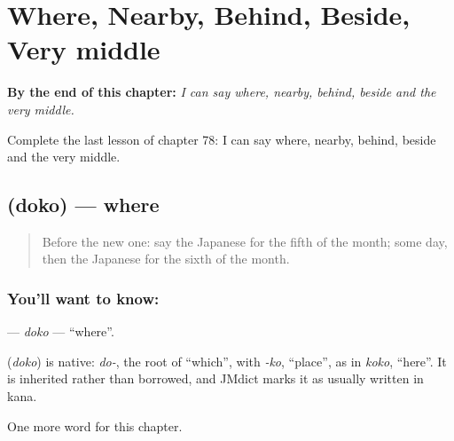 
\chapter{Where, Nearby, Behind, Beside, Very middle}
\label{ch:ja-where-nearby-behind-beside-very-middle}

\begin{chapteropening}
\textbf{By the end of this chapter:} \emph{I can say where, nearby, behind, beside and the very middle.}

Complete the last lesson of chapter 78: I can say where, nearby, behind, beside and the very middle.
\end{chapteropening}

\section[\texorpdfstring{\ja{どこ} (doko)}{どこ (doko)}]{ (doko) — where}

\label{lesson:JA-C78-doko}



\begin{quote}
Before the new one: say the Japanese for the fifth of the month; some day, then the Japanese for the sixth of the month.
\end{quote}

\subsection*{You'll want to know: }
\textbf{} — \emph{doko} — \textquotedblleft{}where\textquotedblright{}.

\begin{cousinweb}
\textbf{} (\emph{doko}) is native: \emph{do-}, the root of \textquotedblleft{}which\textquotedblright{}, with \emph{-ko}, \textquotedblleft{}place\textquotedblright{}, as in \emph{koko}, \textquotedblleft{}here\textquotedblright{}. It is inherited rather than borrowed, and JMdict marks it as usually written in kana.
\end{cousinweb}

\begin{grammarlens}[title={What you've built}]
One more word for this chapter.
\end{grammarlens}

